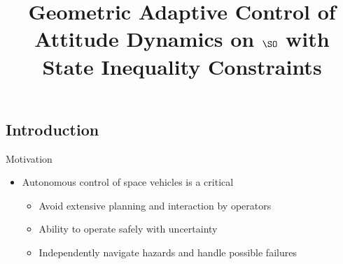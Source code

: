 \documentclass[11pt,professionalfonts]{beamer}
\title[2016 SSPI]{\large\bf  Geometric Adaptive Control of Attitude Dynamics on \(\SO \) with State Inequality Constraints}
\author{\vspace*{-0.3cm}}
\institute{
	\footnotesize
	{\normalsize\bf{Shankar Kulumani and Christopher Poole}}
	\vspace*{0.2cm}
  	\bf{Flight Dynamics \& Control Lab}\\ \vspace*{0.5cm}
 	\begin{figure} %
       	\texttt{[image: gw\_txh\_2cs\_pos]}
  	\end{figure}
}
\date{}
\begin{document}

\setcounter{framenumber}{-1}
\begin{frame} %
  \titlepage
\end{frame}   %

\section*{}
\subsection*{Introduction}  

\begin{frame}[t]{Motivation} %
\begin{itemize}
	\item Autonomous control of space vehicles is a critical
	\begin{itemize}
		\item Avoid extensive planning and interaction by operators
		\item Ability to operate safely with uncertainty 
		\item Independently navigate hazards and handle possible failures
	\end{itemize}
\end{itemize}
\end{frame}   %
\end{document}
